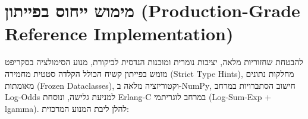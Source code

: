 \clearpage
\section{מימוש ייחוס בפייתון (\textenglish{Production-Grade Reference Implementation})}
\label{sec:python_reference}

להבטחת שחזוריות מלאה, יציבות נומרית ומוכנות הנדסית לביקורת, מנוע הסימולציה בסקריפט  מומש בפייתון קשיח הכולל הקלדה סטטית מחמירה (\textenglish{Strict Type Hints}), מחלקות נתונים מאומתות (\textenglish{Frozen Dataclasses}), וקטוריזציה מלאה ב-\textenglish{NumPy}, חישוב הסתברויות במרחב \textenglish{Log-Odds} למניעת גלישה, ונוסחת \textenglish{Erlang-C} במרחב לוגריתמי (\textenglish{Log-Sum-Exp + lgamma}). להלן ליבת המנוע המרכזית:

